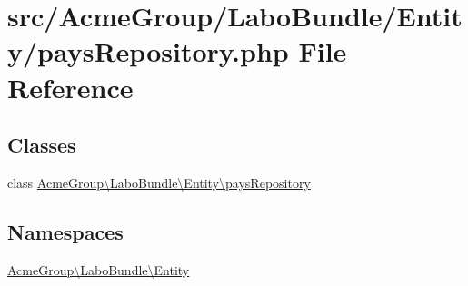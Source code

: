 \hypertarget{pays_repository_8php}{\section{src/\+Acme\+Group/\+Labo\+Bundle/\+Entity/pays\+Repository.php File Reference}
\label{pays_repository_8php}
}
\subsection*{Classes}
\begin{DoxyCompactItemize}
\item 
class \hyperlink{class_acme_group_1_1_labo_bundle_1_1_entity_1_1pays_repository}{Acme\+Group\textbackslash{}\+Labo\+Bundle\textbackslash{}\+Entity\textbackslash{}pays\+Repository}
\end{DoxyCompactItemize}
\subsection*{Namespaces}
\begin{DoxyCompactItemize}
\item 
 \hyperlink{namespace_acme_group_1_1_labo_bundle_1_1_entity}{Acme\+Group\textbackslash{}\+Labo\+Bundle\textbackslash{}\+Entity}
\end{DoxyCompactItemize}
